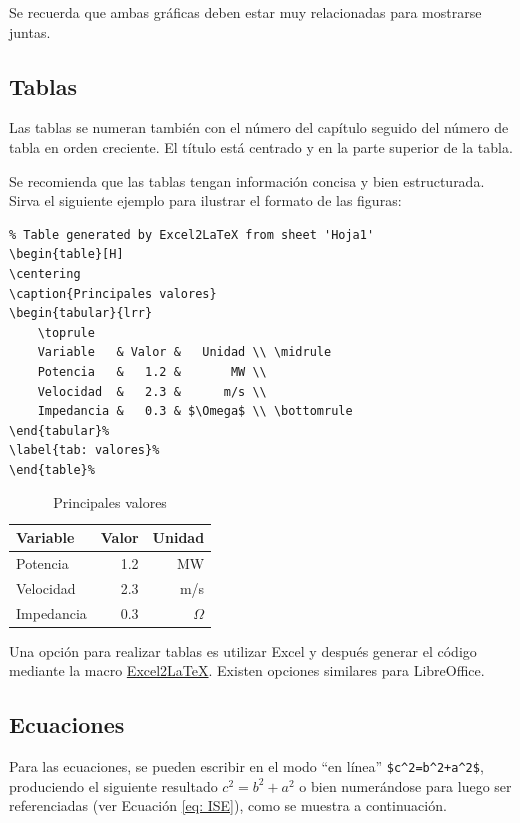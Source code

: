 Se recuerda que ambas gráficas deben estar muy relacionadas para mostrarse juntas.
\subsection{Tablas}
Las tablas se numeran también con el número del capítulo seguido del número de tabla en orden creciente. El título está	 centrado y en la parte superior de la tabla. 


Se recomienda que las tablas tengan información concisa y bien estructurada. Sirva el siguiente ejemplo para ilustrar el formato de las figuras:
\begin{lstlisting}
% Table generated by Excel2LaTeX from sheet 'Hoja1'
\begin{table}[H]
\centering
\caption{Principales valores}
\begin{tabular}{lrr}
	\toprule
	Variable   & Valor &   Unidad \\ \midrule
	Potencia   &   1.2 &       MW \\
	Velocidad  &   2.3 &      m/s \\
	Impedancia &   0.3 & $\Omega$ \\ \bottomrule
\end{tabular}%
\label{tab: valores}%
\end{table}%
\end{lstlisting}
\begin{table}[H]
	\centering
	\caption{Principales valores}
	\begin{tabular}{lrr}
		\toprule
		Variable   & Valor &   Unidad \\ \midrule
		Potencia   &   1.2 &       MW \\
		Velocidad  &   2.3 &      m/s \\
		Impedancia &   0.3 & $\Omega$ \\ \bottomrule
	\end{tabular}%
	\label{tab: valores}%
\end{table}%
Una opción para realizar tablas es utilizar Excel y después generar el código mediante la macro \href{https://ctan.org/pkg/excel2latex?lang=en}{Excel2LaTeX}. Existen opciones similares para LibreOffice.
\subsection{Ecuaciones}
Para las ecuaciones, se pueden escribir en el modo ``en línea''  \lstinline!$c^2=b^2+a^2$!, produciendo el siguiente resultado $c^2=b^2+a^2$ o bien numerándose para luego ser referenciadas (ver Ecuación \ref{eq: ISE}), como se muestra a continuación.

